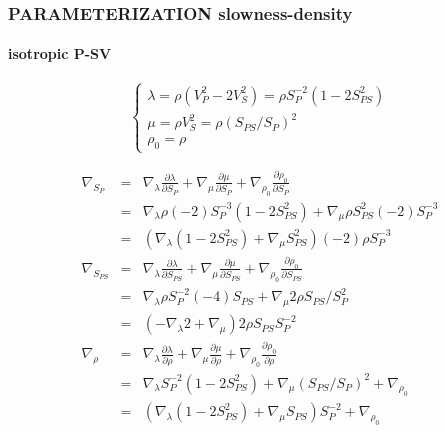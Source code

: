 \documentclass[9pt]{beamer}
\newcommand{\partderi}[2]{\frac{\partial#1}{\partial#2}}
\begin{document}
\begin{frame}\frametitle{PARAMETERIZATION slowness-density}
\framesubtitle{isotropic P-SV}
  
  \begin{center}
  \end{center}
  
  \[\left\{ \begin{array}{l}
    \lambda = \rho (V_P^{2}-2V_S ^2) = \rho S_P^{-2} (1-2S_{PS}^2) \\
    \mu    = \rho V_S^2 = \rho (S_{PS}/S_P)^2 \\
    \rho_0 = \rho 
  \end{array} \right.\]
  
  \begin{eqnarray}
    \nabla_{S_P} &=& \nabla_\lambda \partderi{\lambda}{S_P} + \nabla_\mu \partderi{\mu}{S_P} + \nabla_{\rho_0} \partderi{\rho_0}{S_P} \nonumber\\
		 &=& \nabla_\lambda \rho(-2)S_P^{-3}(1-2S_{PS}^2) + \nabla_\mu \rho S_{PS}^2(-2)S_P^{-3} \nonumber\\
		 &=& \left(\nabla_\lambda (1-2S_{PS}^2) + \nabla_\mu S_{PS}^2 \right)(-2)\rho S_P^{-3} \nonumber\\
    \nabla_{S_{PS}} &=& \nabla_\lambda \partderi{\lambda}{S_{PS}} + \nabla_\mu \partderi{\mu}{S_{PS}} + \nabla_{\rho_0} \partderi{\rho_0}{S_{PS}} \nonumber\\
		    &=& \nabla_\lambda \rho S_P^{-2}(-4)S_{PS} + \nabla_\mu 2\rho S_{PS}/S_P^2 \nonumber\\
		    &=& \left(-\nabla_\lambda 2 + \nabla_\mu \right) 2\rho S_{PS} S_P^{-2} \nonumber\\
    \nabla_{\rho} &=& \nabla_\lambda \partderi{\lambda}{\rho} + \nabla_\mu \partderi{\mu}{\rho} + \nabla_{\rho_0} \partderi{\rho_0}{\rho} \nonumber\\
		  &=& \nabla_\lambda S_P^{-2} (1-2S_{PS}^2) + \nabla_\mu (S_{PS}/S_P)^2 + \nabla_{\rho_0} \nonumber\\
		  &=& \left(\nabla_\lambda (1-2S_{PS}^2) + \nabla_\mu S_{PS} \right) S_P^{-2} + \nabla_{\rho_0} \nonumber
  \end{eqnarray}

\end{frame}
\end{document}
